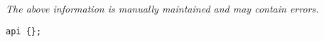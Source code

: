 \label{pkg:initialize\_run\_at}

{\tiny \it The above information is manually maintained and may contain errors.}
\begin{verbatim}
api {};
\end{verbatim}
